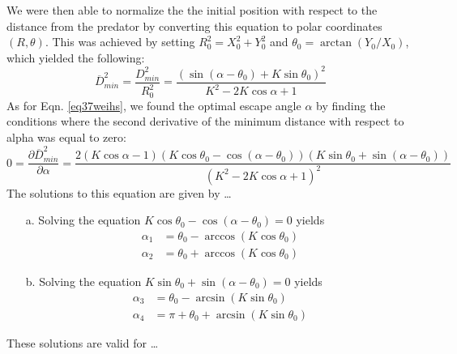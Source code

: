\documentclass[12pt]{article}
\def\ds{\displaystyle}
\def\d{\partial}
\newcommand{\ol}{\overline}
\begin{document}
We were then able to normalize the the initial position with respect to the distance from the predator by converting this equation to polar coordinates $(R, \theta)$. This was achieved by setting $R_0^2 = X_0^2 + Y_0^2$ and $\theta_0 = \arctan(Y_0/X_0)$, which yielded the following:
%
\begin{equation}
\ol{D}^2_{min}= \ds\frac{{D}^2_{min}}{R_0^2 }=
\ds\frac{\left ( \sin(\alpha - \theta_0) + K \sin \theta_0 \right )^2}{K^2-2 K \cos \alpha +1} 
\label{Dmin_polar}
\end{equation}
%
As for Eqn. \ref{eq37weihs}, we found the optimal escape angle $\alpha$ by finding the conditions where the second derivative of the minimum distance with respect to alpha was equal to zero:
%
\begin{equation}
0 = \frac{\d \ol{D}^2_{min}}{\d \alpha} = 
\frac{2(K \cos \alpha - 1)(K\cos \theta_0 - \cos(\alpha - \theta_0))(K\sin \theta_0 + \sin(\alpha -\theta_0))}
{(K^2 - 2K \cos \alpha + 1)^2}
\end{equation} 
%
The solutions to this equation are given by \dots
\begin{enumerate}
\item[a.] Solving the equation $K\cos \theta_0 - \cos(\alpha - \theta_0) = 0$ yields
%
\begin{align*}
\alpha_1 & = \theta_0 - \arccos(K \cos \theta_0) \\
\alpha_2 & = \theta_0 + \arccos(K \cos \theta_0)
\end{align*}
%
\item[b.] Solving the equation $K\sin \theta_0 + \sin(\alpha -\theta_0) = 0$ yields
%
\begin{align*}
\alpha_3 & = \theta_0 - \arcsin(K \sin \theta_0) \\
\alpha_4 & = \pi + \theta_0 + \arcsin(K \sin \theta_0)
\end{align*}
%
\end{enumerate}
These solutions are valid for \dots
\end{document}
